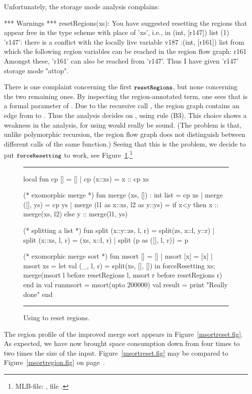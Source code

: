 \documentclass[12pt]{book}
\begin{document}
Unfortunately, the storage mode analysis complains:
\begin{scriptcode}
 *** Warnings ***
resetRegions(xs):
   You have suggested resetting the regions that appear free
   in the type scheme with place of 'xs', i.e., in
   (int, [r147]) list
   (1)
        'r147': there is a conflict with the locally
        live variable
        v187 :(int, [r161]) list
        from which the following region variables can be reached
        in the region flow graph:
             {r161}
        Amongst these, 'r161' can also be reached from 'r147'.
        Thus I have given 'r147' storage mode "attop".
\end{scriptcode}
There is one complaint concerning the first $\mbox{\small\ttfamily resetRegions}$, but none concerning the
two remaining ones.  By inspecting the region-annotated term, one sees that
 is a formal parameter of .  Due to the recursive call
, the region graph contains an edge from  to
. Thus the analysis decides on , using rule (B3). This choice
shows a weakness in the analysis, for using  would really be sound. (The
problem is that, unlike polymorphic recursion, the region flow graph does not
distinguish between different calls of the same function.)  Seeing that this is
the problem, we decide to put $\mbox{\small\ttfamily forceResetting}$ to work, see
Figure~\ref{force.fig}.\footnote{MLB-file: , file
.}
\begin{figure}
\hrule\medskip
\begin{smlcode}
  local
    fun cp [] = []
      | cp (x::xs) = x :: cp xs

    (* exomorphic merge *)
    fun merge (xs, []) : int list = cp xs
      | merge ([], ys) = cp ys
      | merge (l1 as x::xs, l2 as y::ys) =
          if x<y then x :: merge(xs, l2)
          else y :: merge(l1, ys)

    (* splitting a list *)
    fun split (x::y::zs, l, r) = split(zs, x::l, y::r)
      | split (x::xs, l, r) = (xs, x::l, r)
      | split (p as ([], l, r)) = p

    (* exomorphic merge sort *)
    fun msort []  = []
      | msort [x] = [x]
      | msort xs = let val (_, l, r) = split(xs, [], [])
                   in forceResetting xs;
                      merge(msort l before resetRegions l,
                            msort r before resetRegions r)
                   end
  in
    val runmsort = msort(upto 200000)
    val result = print "Really done\n"
  end
\end{smlcode}
\caption{Using  to reset regions.}
\medskip
\hrule
\label{force.fig}
\end{figure}
The region profile of the improved merge sort appears in
Figure~\ref{msortreset.fig}. As expected, we have now brought space consumption
down from four times to two times the size of the input.
Figure~\ref{msortreset.fig} may be compared to Figure~\ref{msortregion.fig} on
page~\pageref{msortregion.fig}.
\end{document}
